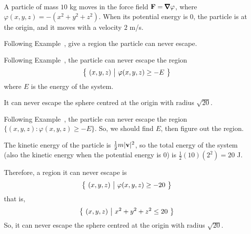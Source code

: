 \begin{question}
A particle of mass $10$ kg moves in the force field $\vF=\vnabla\varphi$, where $\varphi(x,y,z)=-(x^2+y^2+z^2)$. When its potential energy is 0, the particle is at the origin, and  it moves with a velocity $2$ m/s.

Following Example~, give a region the particle can never escape.
\end{question}
\begin{hint}
Following Example~, the particle can never escape the region 
\begin{equation*}
\big\{ \ (x,y,z)\ \big|\ \varphi(x,y,z)\ge -E\ \big\}
\end{equation*}
where $E$ is the energy of the system.
\end{hint}
\begin{answer}
It can never escape the sphere centred at the origin with radius $\sqrt{20}$.
\end{answer}
\begin{solution}

Following Example~, the particle can never escape the region $\{(x,y,z) : \varphi(x,y,z)\ge -E\}$. So, we should find $E$, then figure out the region.

The kinetic energy of the particle is $\frac{1}{2}m|\mathbf{v}|^2$, so the total energy of the system (also the kinetic energy when the potential energy is 0) is $\frac{1}{2}(10)(2^2)=20$ J.

Therefore, a region it can never escape is 
\begin{equation*}
\big\{ \ (x,y,z)\ \big|\ \varphi(x,y,z)\ge -20\ \big\}
\end{equation*}
that is, 
\begin{equation*}
\big\{ \ (x,y,z)\ \big|\ x^2+y^2+z^2 \le 20\ \big\}
\end{equation*}
So, it can never escape the sphere centred at the origin with radius $\sqrt{20}$.
\end{solution}


